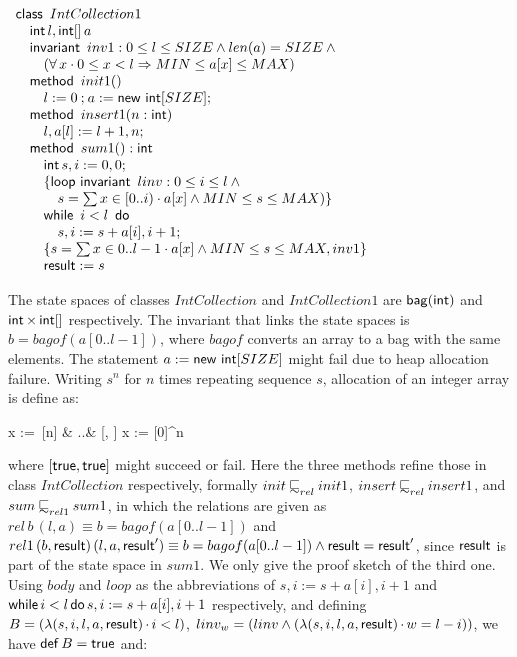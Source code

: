 \documentclass[submission,copyright,creativecommons]{eptcs}
\newcommand{\KW}[1]{\mathop{\sf #1}}
\newcommand{\TRUE}{\KW{true}}
\newcommand{\semi}{\mathbin{;}}
\newcommand{\WHILE}{\KW{while}}
\newcommand{\DO}{\KW{do}}
\newcommand{\DEF}{\KW{def}}
\newcommand{\con}{\wedge}
\newcommand{\imp}{\Rightarrow}
\renewcommand{\dot}{\mathop{.}}
\newcommand{\defeq}{\left.\widehat{=}\right.}
\newcommand{\prefby}{\mathbin{\raisebox{.15em}{$\sqsubset$}\hspace{-.73em}\raisebox{-.3em}{\small$\sim$}}}
\newcommand{\RESULT}{\KW{result}}
\newcommand{\CLASS}{\KW{class}}
\newcommand{\METHOD}{\KW{method}}
\newcommand{\Int}{\KW{int}}
\newcommand{\INVARIANT}{\KW{invariant}}
\newcommand{\NEW}{\KW{new}}
\newcommand{\LOOPINV}{\KW{loop\ invariant}}
\begin{document}
\begin{center}
$\begin{array}{l}
\CLASS~IntCollection1 \\
\quad \Int l, \Int []\,a \\
\quad \INVARIANT~inv1: 0 \leq l \leq SIZE \con len(a) = SIZE \con {} \\
\quad \quad (\forall\, x \cdot 0 \leq x < l \imp MIN \leq a[x] \leq MAX) \\
\quad \METHOD~init1() \\
\quad \quad l := 0 \semi a := \NEW\,\Int[SIZE]; \\
\quad \METHOD~insert1(n : \Int) \\
\quad \quad l, a[l] := l + 1, n; \\
\quad \METHOD~sum1(): \Int \\
\quad \quad \Int s, i := 0, 0 ;\\
\quad \quad \{\LOOPINV~linv: 0 \leq i \leq l \con {}\\
\quad \quad \quad s = \sum x \in [0..i) \cdot a[x] \con MIN \leq s \leq MAX)\}\\
\quad \quad \WHILE~i < l~\DO\\
\quad \quad \quad s, i := s + a[i], i + 1 ; \\
\quad \quad \{s = \sum x \in 0..l - 1 \cdot a[x] \con MIN \leq s \leq MAX, inv1\}\\
\quad \quad \RESULT := s\\
\end{array}$
\end{center}
The state spaces of classes $IntCollection$ and $IntCollection1$ are ${\sf bag}(\Int)$ and $\Int \times \Int[]$ respectively. The invariant that links the state spaces is $b = bagof(a[0..l - 1])$, where $bagof$ converts an array to a bag with the same elements. The statement $a := \NEW\,\Int[SIZE]$ might fail due to heap allocation failure. Writing $s^n$ for $n$ times repeating sequence $s$, allocation of an integer array is define as:
\begin{eqnarr}
  x := \NEW\,\Int[n] & \defeq & [\TRUE, \TRUE] \semi x := [0]^n
\end{eqnarr}where $[\TRUE, \TRUE]$ might succeed or fail. Here the three methods refine those in class $IntCollection$ respectively, formally $init \prefby_{rel} init1$, $insert \prefby_{rel} insert1$, and $sum \prefby_{rel1} sum1$, in which the relations are given as $rel\,b\,(l, a) \equiv b = bagof(a[0..l - 1])$ and $rel1\,(b, \RESULT)\,(l, a, \RESULT') \equiv b = bagof(a[0..l - 1]) \con \RESULT = \RESULT'$, since $\RESULT$ is part of the state space in $sum1$. We only give the proof sketch of the third one. Using $body$ and $loop$ as the abbreviations of $s, i := s + a[i], i + 1$ and $\WHILE i < l \DO s, i := s + a[i], i + 1$ respectively, and defining $B = (\lambda (s, i, l, a, \RESULT) \dot i < l)$, $linv_w = (linv \con (\lambda (s, i, l, a, \RESULT) \dot w = l - i))$, we have $\DEF B = \TRUE$ and: 
\end{document}
